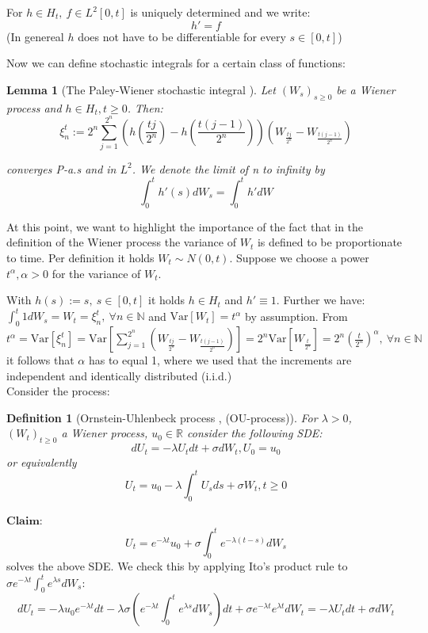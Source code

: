 \documentclass[%
thesis=student,%
coverpage=false,%
titlepage=false,%
headmarks=true, %
english,%
font=libertine, %
math=newpxtx, %
BCOR=5mm,%
coverBCOR=11mm%
]{tumbook}
\newtheorem{definition}{Definition}[section]
\newtheorem{lemma}{Lemma}
\begin{document}
For $h \in H_{t},\ f \in L^{2}[0,t]$ is uniquely determined and we write: 
\[
h' = f
\]
(In genereal $h$ does not have to be differentiable for every $s \in [0,t]$)

Now we can define stochastic integrals for a certain class of functions:

\begin{lemma}[The Paley-Wiener stochastic integral \cite{gantert:2024}] 
Let $(W_{s})_{s\geq 0}$ be a Wiener process and $h \in H_{t}, t \geq 0$. Then:
\[
\xi_{n}^{t} := 2^{n}\sum_{j=1}^{2^{n}}(h(\frac{tj}{2^{n}})-h(\frac{t(j-1)}{2^{n}}))(W_{\frac{tj}{2^{n}}}-W_{\frac{t(j-1)}{2^{n}}}) 
\]

converges P-a.s and in $L^{2}$. We denote the limit of n to infinity by
\[
\int_{0}^{t}h'(s)dW_{s} = \int_{0}^{t}h'dW
\]
\end{lemma}

At this point, we want to highlight the importance of the fact that in the definition of the Wiener process the variance of $W_{t}$ is defined to be proportionate to time. Per definition it holds $W_{t} \sim N(0,t)$. Suppose we choose a power $t^{\alpha}, \alpha > 0$ for the variance of $W_{t}$. 

With $h(s) := s, \ s \in [0,t]$ it holds $h \in H_{t}$ and $h' \equiv 1$. Further we have: $\int_{0}^{t} 1 dW_{s} = W_{t} = \xi_{n}^{t}, \ \forall n \in \mathbb{N}$ and $\mathrm{Var}[W_{t}] = t^{\alpha}$ by assumption. From 
$t^{\alpha} = \mathrm{Var}[\xi_{n}^{t}] = \mathrm{Var}\left[\sum_{j=1}^{2^{n}}\left(W_{\frac{tj}{2^{n}}} - W_{\frac{t(j-1)}{2^{n}}}\right)\right] = 2^{n}\mathrm{Var}\left[W_{\frac{t}{2^n}}\right] = 2^{n}\left(\frac{t}{2^{n}}\right)^{\alpha}, \ \forall n \in \mathbb{N}$ it follows that $\alpha$ has to equal 1, where we used that the increments are independent and identically distributed (i.i.d.)  \\

Consider the process:

\begin{definition}[Ornstein-Uhlenbeck process \cite{gantert:2024}, (OU-process)] 
For $\lambda > 0$, $(W_{t})_{t\geq 0}$ a Wiener process, $u_{0} \in \mathbb{R}$ consider the following SDE:
\[
dU_{t} = -\lambda U_{t} dt + \sigma dW_{t}, U_{0} = u_{0}
\]
\label{def:OU process}
or equivalently
\[
U_{t} = u_{0} - \lambda\int_{0}^{t}U_{s}ds + \sigma W_{t}, t \geq 0
\]  
\end{definition}

$\textbf{Claim}$: 
\[
U_{t} = e^{-\lambda t}u_{0} + \sigma\int_{0}^{t}e^{-\lambda (t-s)}dW_{s}
\]
solves the above SDE. We check this by applying Ito's product rule to $\sigma e^{-\lambda t}\int_{0}^{t}e^{\lambda s}dW_{s}$:
\[
dU_{t} = -\lambda u_{0}e^{-\lambda t}dt - \lambda\sigma(e^{-\lambda t}\int_{0}^{t}e^{\lambda s}dW_{s})dt + \sigma e^{-\lambda t}e^{\lambda t}dW_{t} = -\lambda U_{t} dt + \sigma dW_{t}
\]
\end{document}
